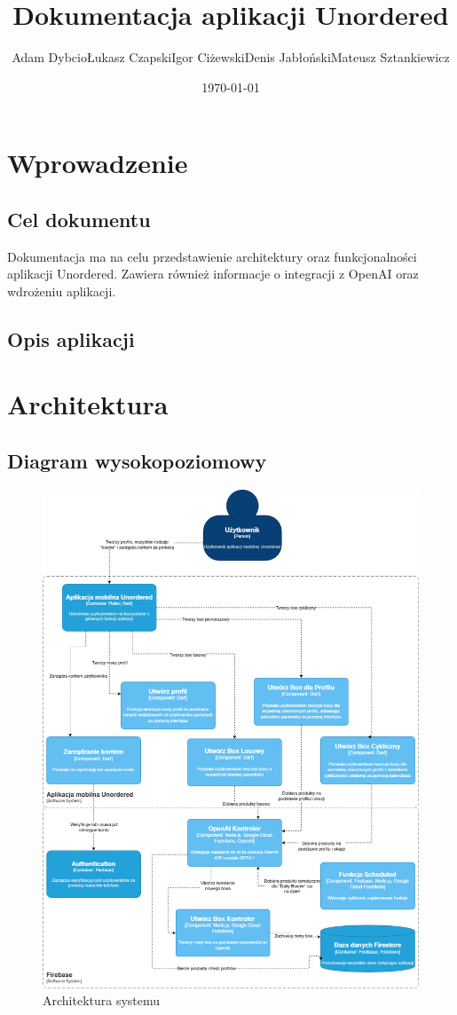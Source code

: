 \documentclass[a4paper, 12pt]{article}
\title{Dokumentacja aplikacji Unordered}
\author{Adam Dybcio\endline Łukasz Czapski\endline Igor Ciżewski\endline Denis Jabłoński\endline Mateusz Sztankiewicz}
\date{\today}
\begin{document}
\maketitle
\newpage
\tableofcontents
\newpage

\section{Wprowadzenie}
\subsection{Cel dokumentu}
Dokumentacja ma na celu przedstawienie architektury oraz funkcjonalności aplikacji Unordered.
Zawiera również informacje o integracji z OpenAI oraz wdrożeniu aplikacji.

\subsection{Opis aplikacji}

\newpage
\section{Architektura}
\subsection{Diagram wysokopoziomowy}
\begin{figure}[ht]
    \centering
    \includegraphics[height=0.745\textheight,keepaspectratio]{images/unordered.c4.png}
    \caption{Architektura systemu}
    \label{fig:arch}
\end{figure}
\end{document}

